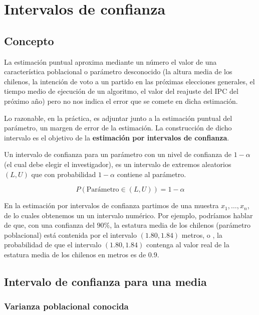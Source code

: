 \documentclass[
  11pt,
]{book}
\theoremstyle{definition}
\theoremstyle{definition}
\theoremstyle{definition}
\theoremstyle{definition}
\theoremstyle{remark}
\begin{document}
\chapter{Intervalos de confianza}\label{intervalos-de-confianza}

\section{Concepto}\label{intervalos-de-confianza-concepto}

La estimación puntual aproxima mediante un número el valor de una característica poblacional o parámetro desconocido (la altura media de los chilenos, la intención de voto a un partido en las próximas elecciones generales, el tiempo medio de ejecución de un algoritmo, el valor del reajuste del IPC del próximo año) pero no nos indica el error que se comete en dicha estimación. \citep[página 254]{Devore}

Lo razonable, en la práctica, es adjuntar junto a la estimación puntual del parámetro, un margen de error de la estimación. La construcción de dicho intervalo es el objetivo de la \textbf{estimación por intervalos de confianza}.

Un intervalo de confianza para un parámetro con un nivel de confianza de \(1-\alpha\) (el cual debe elegir el investigador), es un intervalo de extremos aleatorios \((L,U)\) que con probabilidad \(1-\alpha\) contiene al parámetro.

\[
P(\text{Parámetro} \in (L,U)) = 1-\alpha
\]

En la estimación por intervalos de confianza partimos de una muestra \(x_1,\ldots,x_n\), de lo cuales obtenemos un un intervalo numérico. Por ejemplo, podríamos hablar de que, con una confianza del \(90\%\), la estatura media de los chilenos (parámetro poblacional) está contenida por el intervalo \((1.80, 1.84)\) metros, o , la probabilidad de que el intervalo \((1.80,1.84)\) contenga al valor real de la estatura media de los chilenos en metros es de \(0.9\).

\section{Intervalo de confianza para una media}\label{intervalo-de-confianza-para-la-media}

\subsection{Varianza poblacional conocida}\label{intervalo-de-confianza-para-la-media-varianza-conocida}
\end{document}

